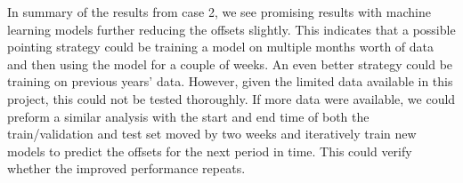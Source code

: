 


In summary of the results from case 2, we see promising results with machine learning models further reducing the offsets slightly.  
This indicates that a possible pointing strategy could be training a model on multiple months worth of data and then using the model for a couple of weeks.
An even better strategy could be training on previous years' data.
However, given the limited data available in this project, this could not be tested thoroughly.
If more data were available,
we could preform a similar analysis with the start and end time of both the train/validation and test set moved by two weeks and iteratively train new models to predict the offsets for the next period in time.
This could verify whether the improved performance repeats.\\



